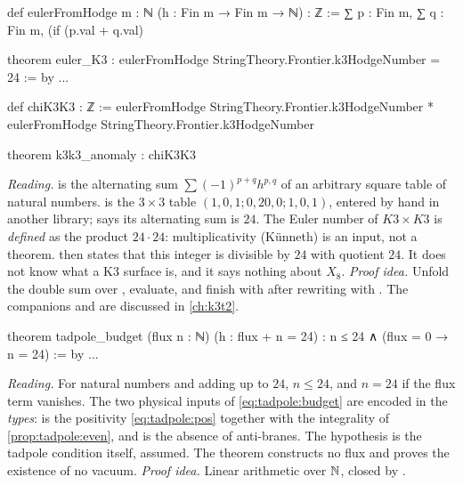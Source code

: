 \begin{leanbox}
\begin{leancode}
def eulerFromHodge {m : ℕ} (h : Fin m → Fin m → ℕ) : ℤ :=
  ∑ p : Fin m, ∑ q : Fin m,
    (if (p.val + q.val) %

theorem euler_K3 :
    eulerFromHodge StringTheory.Frontier.k3HodgeNumber = 24 := by ...

def chiK3K3 : ℤ := eulerFromHodge StringTheory.Frontier.k3HodgeNumber *
  eulerFromHodge StringTheory.Frontier.k3HodgeNumber

theorem k3k3_anomaly : chiK3K3 %
\end{leancode}
\emph{Reading.}  is the alternating sum $\sum(-1)^{p+q}h^{p,q}$ of an
arbitrary square table of natural numbers.  is the $3\times3$ table
$(1,0,1;0,20,0;1,0,1)$, entered by hand in another library;  says its
alternating sum is $24$. The Euler number of $K3\times K3$ is \emph{defined} as the product
$24\cdot24$: multiplicativity (K\"unneth) is an input, not a theorem. 
then states that this integer is divisible by $24$ with quotient $24$. It does not know what
a K3 surface is, and it says nothing about $X_8$. \emph{Proof idea.} Unfold the double sum
over , evaluate, and finish with  after rewriting with
. The companions  and  are discussed
in \cref{ch:k3t2}.
\end{leanbox}

\begin{leanbox}
\begin{leancode}
theorem tadpole_budget (flux n : ℕ) (h : flux + n = 24) :
    n ≤ 24 ∧ (flux = 0 → n = 24) := by ...
\end{leancode}
\emph{Reading.} For natural numbers  and  adding up to $24$, $n\le24$, and
$n=24$ if the flux term vanishes. The two physical inputs of \eqref{eq:tadpole:budget} are
encoded in the \emph{types}:  is the positivity \eqref{eq:tadpole:pos} together
with the integrality of \cref{prop:tadpole:even}, and  is the absence of
anti-branes. The hypothesis  is the tadpole condition itself, assumed. The theorem
constructs no flux and proves the existence of no vacuum. \emph{Proof idea.} Linear
arithmetic over $\mathbb{N}$, closed by .
\end{leanbox}

